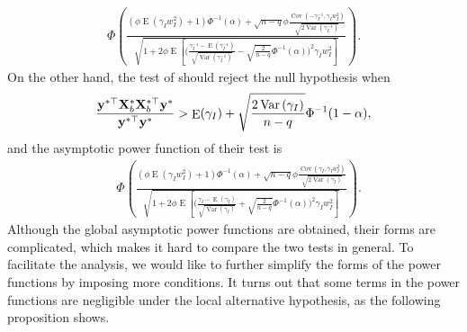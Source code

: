 \documentclass[smallextended]{svjour3}       %
\DeclareMathOperator{\myE}{E}
\DeclareMathOperator{\myVar}{Var}
\DeclareMathOperator{\myCov}{Cov}
\newcommand{\By}{\mathbf{y}}    \newcommand{\Bz}{\mathbf{z}}
\begin{document}
\begin{equation*}\label{eq:powerProposed}
    \begin{split}
    \Phi\left( 
        \frac{
            \left( \phi \myE (\gamma_I w_I^2) + 1 \right)
            \Phi^{-1}(\alpha)
            +
            \sqrt{n-q}
            \phi
            \frac{
                \myCov\left( - \gamma_I^{-1}, \gamma_I w_I^2 \right)
                }{
                    \sqrt{2 \myVar(\gamma_I^{-1})}
                }
        }{
            \sqrt{
                1
                +
                2 \phi
        \myE\left[ 
            \Big( \frac{\gamma_I^{-1} -\myE(\gamma_I^{-1})}{\sqrt{\myVar\left(\gamma_I^{-1}\right)}} -\sqrt{\frac{2}{n-q}} \Phi^{-1}(\alpha) \Big)^2
        \gamma_I w_I^2
    \right]
            }
        } 
    \right).
    \end{split}
\end{equation*}
On the other hand, the test of \cite{Goeman2006} should reject the null hypothesis when
\begin{equation*}
        \frac{
            \By^{*\top} \BX_b^* \BX_b^{*\top} \By^*
        }{
            \By^{*\top} \By^*
        } 
        >
        \myE (\gamma_I)
        +\sqrt{
            \frac{2\myVar\left( \gamma_I \right)}{n-q} 
        }
        \Phi^{-1}(1-\alpha),
\end{equation*}
and the asymptotic power function of their test is
\begin{equation*}\label{eq:powerTheirs}
    \begin{split}
    &\Phi\left( 
        \frac{
            \left( \phi \myE (\gamma_I w_I^2) + 1 \right)
            \Phi^{-1}(\alpha)
            +
            \sqrt{n-q}
            \phi
            \frac{
                \myCov\left( \gamma_I, \gamma_I w_I^2 \right)
            }{
                \sqrt{2 \myVar(\gamma_I)}
            }
        }{
            \sqrt{
                1 
                +
                2 \phi
    \myE\left[ 
        \Big( \frac{\gamma_I -\myE(\gamma_I)}{\sqrt{\myVar(\gamma_I)}} +\sqrt{\frac{2}{n-q}} \Phi^{-1}(\alpha) \Big)^2
        \gamma_I w_I^2
    \right]
            }
        } 
    \right).
    \end{split}
\end{equation*}
Although the global asymptotic power functions are obtained, their forms are complicated, which makes it hard to compare the two tests in general.
To facilitate the analysis, we would like to further simplify the forms of the power functions by imposing more conditions.
It turns out that some terms in the power functions are negligible under the local alternative hypothesis, as the following proposition shows.
\end{document}
